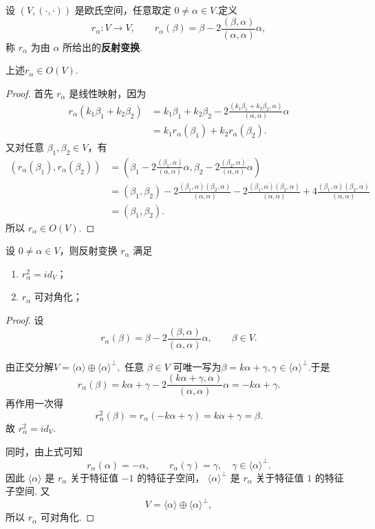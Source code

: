 \begin{definition}
	设 $(V,(\cdot,\cdot))$ 是欧氏空间，任意取定 $0\ne\alpha\in V$.定义
	\[
	r_{\alpha}:V\longrightarrow V,
	\qquad
	r_{\alpha}(\beta)=\beta-2\frac{(\beta,\alpha)}{(\alpha,\alpha)}\alpha,
	\]
	 称 $r_{\alpha}$ 为由 $\alpha$ 所给出的\textbf{反射变换}.
\end{definition}
\begin{proposition}
	上述$r_{\alpha}\in O(V)$.
\end{proposition}
\begin{proof}
	首先 $r_{\alpha}$ 是线性映射，因为
	\[
	\begin{aligned}
		r_{\alpha}(k_1\beta_1+k_2\beta_2)
		&=k_1\beta_1+k_2\beta_2
		-2\frac{(k_1\beta_1+k_2\beta_2,\alpha)}{(\alpha,\alpha)}\alpha \\
		&=k_1r_{\alpha}(\beta_1)+k_2r_{\alpha}(\beta_2).
	\end{aligned}
	\]
	又对任意 $\beta_1,\beta_2\in V$，有
	\[
	\begin{aligned}
		(r_\alpha(\beta_1),r_\alpha(\beta_2))
		&=\left(\beta_1-2\frac{(\beta_1,\alpha)}{(\alpha,\alpha)}\alpha,
		\beta_2-2\frac{(\beta_2,\alpha)}{(\alpha,\alpha)}\alpha\right)\\
		&=(\beta_1,\beta_2)-2\frac{(\beta_1,\alpha)(\beta_2,\alpha)}{(\alpha,\alpha)}
		-2\frac{(\beta_1,\alpha)(\beta_2,\alpha)}{(\alpha,\alpha)}
		+4\frac{(\beta_1,\alpha)(\beta_2,\alpha)}{(\alpha,\alpha)}\\
		&=(\beta_1,\beta_2).
	\end{aligned}
	\]
	所以 $r_\alpha\in O(V)$.
\end{proof}

\begin{proposition}
	设 $0\ne\alpha\in V$，则反射变换 $r_\alpha$ 满足
	\begin{enumerate}
		\item $r_\alpha^2=id_V$；
		\item $r_\alpha$ 可对角化；
	\end{enumerate}
\end{proposition}
\begin{proof}
	设
	\[r_\alpha(\beta)
	=
	\beta-2\frac{(\beta,\alpha)}{(\alpha,\alpha)}\alpha,
	\qquad \beta\in V.\]

	由正交分解$ V=\langle \alpha\rangle\oplus \langle \alpha\rangle^\perp,$
	任意 $\beta\in V$ 可唯一写为$\beta=k\alpha+\gamma,\gamma\in \langle \alpha\rangle^\perp. $于是
	\[	r_\alpha(\beta)
	=
	k\alpha+\gamma-2\frac{(k\alpha+\gamma,\alpha)}{(\alpha,\alpha)}\alpha
	=
	-k\alpha+\gamma.\]
再作用一次得
\[r_\alpha^2(\beta)=r_\alpha(-k\alpha+\gamma)=k\alpha+\gamma=\beta.\]
	故 $r_\alpha^2=id_V$.
	
同时，由上式可知
	\[
	r_\alpha(\alpha)=-\alpha,
	\qquad
	r_\alpha(\gamma)=\gamma,\quad \gamma\in \langle \alpha\rangle^\perp.
	\]
	因此 $\langle \alpha\rangle$ 是 $r_\alpha$ 关于特征值 $-1$ 的特征子空间，
	$\langle \alpha\rangle^\perp$ 是 $r_\alpha$ 关于特征值 $1$ 的特征子空间.
	又
	\[
	V=\langle \alpha\rangle\oplus \langle \alpha\rangle^\perp,
	\]
	所以 $r_\alpha$ 可对角化.
	
	
	
\end{proof}


